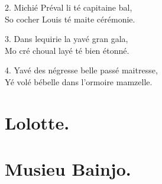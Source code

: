 \documentclass[a5paper,10pt]{book}
\begin{document}
\begin{song}
\end{song}

\begin{stanza}
\item[2.]
  Michi\'e Pr\'eval li t\'e capitaine bal,\\
  So cocher Louis t\'e maite c\'er\'emonie.
\item[3.]
  Dans lequirie la yav\'e gran gala,\\
  Mo cr\'e choual lay\'e t\'e bien \'etonn\'e.
\item[4.]
  Yav\'e des n\'egresse belle pass\'e maitresse,\\
  Y\'e vol\'e b\'ebelle dans l'ormoire mamzelle.
\end{stanza}


\newpage
\section{Lolotte.}
\thispagestyle{empty}

\begin{song}
\end{song}


\newpage
\section{Musieu Bainjo.}
\thispagestyle{empty}

\begin{songpart}
\end{songpart}
\begin{song}
\end{song}

\newpage
\thispagestyle{empty}
\end{document}
